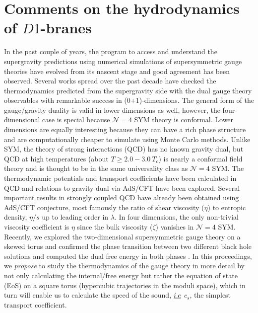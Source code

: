 \section{Comments on the hydrodynamics of $D1$-branes}
In the past couple of years, the program to access and understand the supergravity predictions using numerical simulations of supersymmetric gauge theories have evolved from its nascent stage and good agreement has been observed. Several works \cite{Catterall:2008yz,Hanada:2008ez,Berkowitz:2016jlq} spread over the past decade have checked the thermodynamics
predicted from the supergravity side with the dual gauge theory observables with remarkable success in (0+1)-dimensions. 
The general form of the gauge/gravity duality is valid in lower dimensions as well, however, the four-dimensional case is special because $\mathcal{N}=4$ SYM theory is conformal. Lower dimensions are equally interesting because they can have a rich phase structure and are computationally cheaper to simulate using Monte Carlo methods.
Unlike SYM, the theory of strong interactions (QCD) has no known gravity dual, but QCD at high temperatures (about $T \ge 2.0-3.0~T_{c}$) is nearly a conformal field theory and is thought to be in the same universality class as $\mathcal{N}=4$ SYM. The thermodynamic potentials and transport coefficients have been calculated in 
QCD \cite{Boyd:1996bx, Nakamura:2004sy, Panero:2009tv} and relations to gravity dual via 
AdS/CFT have been explored.  Several important results in strongly coupled QCD have already been obtained using AdS/CFT conjecture, most famously the ratio of shear viscosity ($\eta$) to entropic density, $\eta/s$ up to leading order in $\lambda$. In four dimensions, the only non-trivial 
viscosity coefficient is $\eta$ since the bulk viscosity ($\zeta$) vanishes in $\mathcal{N}=4$ SYM. 
Recently, we explored the two-dimensional supersymmetric gauge theory on a skewed torus and confirmed the phase transition between two different black hole solutions and computed the dual free energy in both phases \cite{Catterall:2017lub, Jha:2017zad}. 
In this proceedings, we \textit{propose} to study the thermodynamics of the gauge theory in more detail by not only calculating the internal/free energy but 
rather the equation of state (EoS) on a square torus (hypercubic trajectories in the moduli space), which in turn will enable us to calculate the speed of the sound,
$\emph{i.e}$ $c_{s}$, the simplest transport coefficient.


